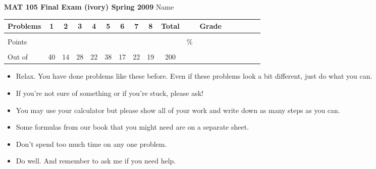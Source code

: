 \documentclass[12pt]{article}
\begin{document}
{\bf MAT 105 Final Exam (ivory) Spring 2009} \hspace{.4in} {\large Name} \hrulefill

\hspace{.2in}

\begin{center}

\begin{tabular}
{|l|c|c|c|c|c|c|c|c|c|c|c|c|c|c|c|c|} \hline

 Problems & \hspace{5 pt} 1 \hspace{5 pt}  & \hspace{5 pt} 2 \hspace{5 pt} & \hspace{5 pt} 3 \hspace{5 pt} & \hspace{5 pt} 4 \hspace{5 pt}& \hspace{5 pt} 5 \hspace{5 pt} & \hspace{5 pt} 6 \hspace{5 pt} & \hspace{5 pt} 7 \hspace{5 pt}   & \hspace{5 pt} 8 \hspace{5 pt} &  \hspace{5 pt} Total  \hspace{5 pt} & &  \hspace{5 pt} Grade \hspace{5 pt}  \\ \hline
&&&&&&&&&&&\\  
Points &&&&&&&&&&   \hspace{.6in}\% &  \\ 
&&&&&&&&&&& \\  \hline
Out of & 40  & 14 & 28 & 22 & 38 & 17 & 22 & 19 &200 & & \\ \hline

\end {tabular}
 
\end{center}

\hspace{.2in}

\begin{itemize}
\item Relax.  You have done problems like these before. Even if these problems look a bit different, just do what you can. 
\item  If you're not sure of something or if you're stuck, please ask! 
\item You may use your calculator but please show all of your work and write down as many steps as you can.  
\item Some formulas from our book that you might need are on a separate sheet.
\item Don't spend too much time on any one problem.
\item  Do well.  And remember to ask me if you need help.
\end{itemize}
\end{document}
